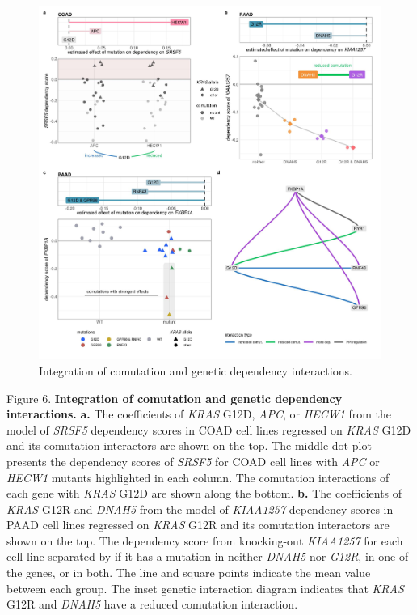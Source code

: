 \documentclass[english, 10pt, letterpaper]{article}
\newcommand{\KRAS}{\emph{KRAS}}
\begin{document}
\begin{figure}[h!]
\centering
\includegraphics[width=180mm]{figures/Fig_6.jpeg}
\caption{Integration of comutation and genetic dependency interactions.}
\label{fig:dep-map-comut-adding}
\end{figure}
\newpage
\noindent Figure 6. \textbf{Integration of comutation and genetic dependency interactions.}
\textbf{a.} The coefficients of \KRAS{} G12D, \emph{APC}, or \emph{HECW1} from the model of \emph{SRSF5} dependency scores in COAD cell lines regressed on \KRAS{} G12D and its comutation interactors are shown on the top. The middle dot-plot presents the dependency scores of \emph{SRSF5} for COAD cell lines with \emph{APC} or \emph{HECW1} mutants highlighted in each column. The comutation interactions of each gene with \KRAS{} G12D are shown along the bottom.
\textbf{b.} The coefficients of \KRAS{} G12R and \emph{DNAH5} from the model of \emph{KIAA1257} dependency scores in PAAD cell lines regressed on \KRAS{} G12R and its comutation interactors are shown on the top. The dependency score from knocking-out \emph{KIAA1257} for each cell line separated by if it has a mutation in neither \emph{DNAH5} nor \emph{G12R}, in one of the genes, or in both. The line and square points indicate the mean value between each group. The inset genetic interaction diagram indicates that \KRAS{} G12R and \emph{DNAH5} have a reduced comutation interaction.
\end{document}
